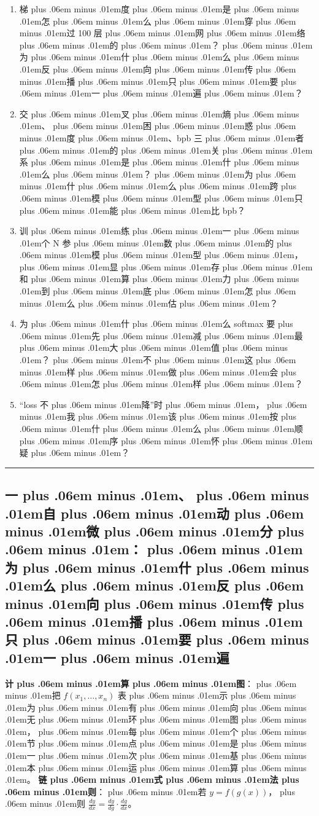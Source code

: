 \documentclass[
]{article}
\providecommand{\tightlist}{%
  \setlength{\itemsep}{0pt}\setlength{\parskip}{0pt}}
\def\zh#1{{\zhfont #1}}
\def\zhglue{\hskip0pt plus .06em minus .01em}
\begin{document}
\begin{enumerate}
\def\labelenumi{\arabic{enumi}.}
\tightlist
\item
  \zh{梯\zhglue 度\zhglue 是\zhglue 怎\zhglue 么\zhglue 穿\zhglue 过} 100 \zh{层\zhglue 网\zhglue 络\zhglue 的\zhglue ？\zhglue 为\zhglue 什\zhglue 么\zhglue 反\zhglue 向\zhglue 传\zhglue 播\zhglue 只\zhglue 要\zhglue 一\zhglue 遍\zhglue ？}
\item
  \zh{交\zhglue 叉\zhglue 熵\zhglue 、\zhglue 困\zhglue 惑\zhglue 度\zhglue 、}bpb \zh{三\zhglue 者\zhglue 的\zhglue 关\zhglue 系\zhglue 是\zhglue 什\zhglue 么\zhglue ？\zhglue 为\zhglue 什\zhglue 么\zhglue 跨\zhglue 模\zhglue 型\zhglue 只\zhglue 能\zhglue 比} bpb\zh{？}
\item
  \zh{训\zhglue 练\zhglue 一\zhglue 个} N \zh{参\zhglue 数\zhglue 的\zhglue 模\zhglue 型\zhglue ，\zhglue 显\zhglue 存\zhglue 和\zhglue 算\zhglue 力\zhglue 到\zhglue 底\zhglue 怎\zhglue 么\zhglue 估\zhglue ？}
\item
  \zh{为\zhglue 什\zhglue 么} softmax \zh{要\zhglue 先\zhglue 减\zhglue 最\zhglue 大\zhglue 值\zhglue ？\zhglue 不\zhglue 这\zhglue 样\zhglue 做\zhglue 会\zhglue 怎\zhglue 样\zhglue ？}
\item
  ``loss \zh{不\zhglue 降}''\zh{时\zhglue ，\zhglue 我\zhglue 该\zhglue 按\zhglue 什\zhglue 么\zhglue 顺\zhglue 序\zhglue 怀\zhglue 疑\zhglue ？}
\end{enumerate}

\begin{center}\rule{0.5\linewidth}{0.5pt}\end{center}

\subsection{\zh{一\zhglue 、\zhglue 自\zhglue 动\zhglue 微\zhglue 分\zhglue ：\zhglue 为\zhglue 什\zhglue 么\zhglue 反\zhglue 向\zhglue 传\zhglue 播\zhglue 只\zhglue 要\zhglue 一\zhglue 遍}}\label{ux4e00ux81eaux52a8ux5faeux5206ux4e3aux4ec0ux4e48ux53cdux5411ux4f20ux64adux53eaux8981ux4e00ux904d}

\textbf{\zh{计\zhglue 算\zhglue 图}}\zh{：\zhglue 把} \(f(x_1,\dots,x_n)\) \zh{表\zhglue 示\zhglue 为\zhglue 有\zhglue 向\zhglue 无\zhglue 环\zhglue 图\zhglue ，\zhglue 每\zhglue 个\zhglue 节\zhglue 点\zhglue 是\zhglue 一\zhglue 次\zhglue 基\zhglue 本\zhglue 运\zhglue 算\zhglue 。} \textbf{\zh{链\zhglue 式\zhglue 法\zhglue 则}}\zh{：\zhglue 若} \(y = f(g(x))\)\zh{，\zhglue 则} \(\frac{dy}{dx} = \frac{dy}{dg}\cdot\frac{dg}{dx}\)\zh{。}
\end{document}
